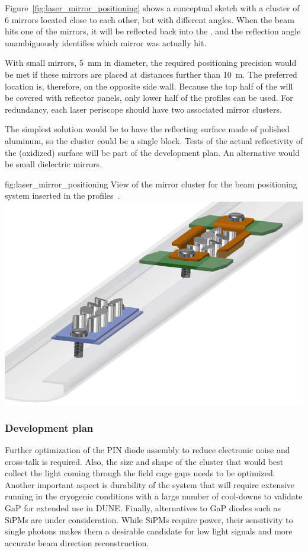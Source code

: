 Figure~\ref{fig:laser_mirror_positioning} shows a conceptual sketch with a cluster of \num{6} mirrors located close to each other, but with different angles. 
When the beam hits one of the mirrors, it will be reflected back into the , and the reflection angle unambiguously identifies which mirror was actually hit. 

With small mirrors, \SI{5}{\milli\m} in diameter, the required positioning precision would be met if these mirrors are placed at distances further than \SI{10}{\m}. The preferred location is, therefore, on the opposite  side wall. Because the top half of the  will be covered with  reflector panels, only lower half of the  profiles can be used. For redundancy, each laser periscope should have two associated mirror clusters. 

The simplest solution would be to have the reflecting surface made of polished aluminum, so the cluster could be a single block. Tests of the actual reflectivity of the (oxidized) surface will be part of the development plan. An alternative would be small dielectric mirrors.

\begin{dunefigure}{fig:laser_mirror_positioning}
{View of the mirror cluster for the beam positioning system inserted in the  profiles~\cite{bib:yu2019a}.}
\includegraphics[width=0.7\linewidth]{graphics/laser_mirror_positioning.pdf}
\end{dunefigure}

\subsubsection{Development plan}

Further optimization of the PIN diode %
 assembly to reduce electronic noise and cross-talk is required. Also, the size and shape of the cluster that would best collect the light coming through the field cage gaps needs to be optimized.  Another important aspect is durability of the system that will require extensive running in the cryogenic conditions with  a large number of cool-downs to validate GaP for extended use in DUNE. Finally, alternatives to GaP diodes such as SiPMs are under consideration. While SiPMs require power, their sensitivity to single photons makes them a desirable candidate for low light signals and more accurate beam direction reconstruction. 

